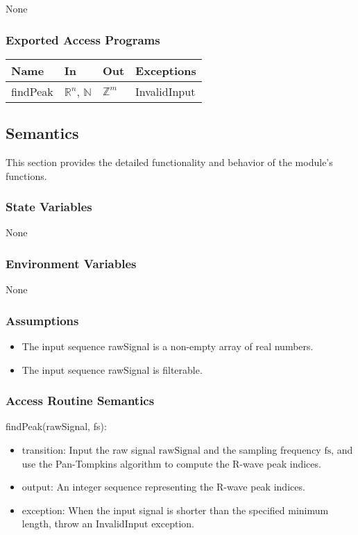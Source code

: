 \documentclass[12pt, titlepage]{article}
\begin{document}
None

\subsubsection{Exported Access Programs}

\begin{center}
\begin{tabular}{p{2cm} p{4cm} p{4cm} p{2cm}}
\hline
\textbf{Name} & \textbf{In} & \textbf{Out} & \textbf{Exceptions} \\
\hline
findPeak & $\mathbb{R}^n$, $\mathbb{N}$ & $\mathbb{Z}^m$ & InvalidInput \\
\hline
\end{tabular}
\end{center}

\subsection{Semantics}

This section provides the detailed functionality and behavior of the module’s
functions.

\subsubsection{State Variables}

None

\subsubsection{Environment Variables}

None

\subsubsection{Assumptions}

\begin{itemize}
\item The input sequence rawSignal is a non-empty array of real numbers.
\item The input sequence rawSignal is filterable.
\end{itemize}

\subsubsection{Access Routine Semantics}

\noindent findPeak(rawSignal, fs):
\begin{itemize}
\item transition: Input the raw signal $\text{rawSignal}$ and the sampling
frequency $\text{fs}$, and use the Pan-Tompkins algorithm to compute the R-wave
peak indices.
\item output: An integer sequence representing the R-wave peak indices.
\item exception: When the input signal is shorter than the specified minimum
length, throw an InvalidInput exception.
\end{itemize}
\end{document}
